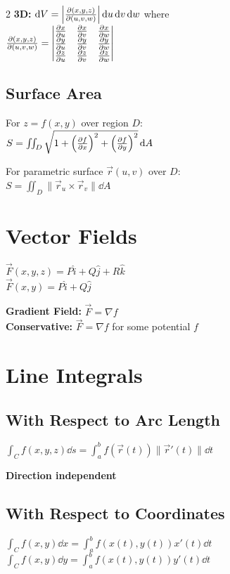 \documentclass[8pt]{extarticle}
\begin{document}
\begin{multicols}{2}
\textbf{3D:} $\dd{V} = \left|\pdv{(x,y,z)}{(u,v,w)}\right| \dd{u}\dd{v}\dd{w}$ where \\
$\pdv{(x,y,z)}{(u,v,w)} = \begin{vmatrix} \pdv{x}{u} & \pdv{x}{v} & \pdv{x}{w} \\ \pdv{y}{u} & \pdv{y}{v} & \pdv{y}{w} \\ \pdv{z}{u} & \pdv{z}{v} & \pdv{z}{w} \end{vmatrix}$

\subsection*{Surface Area}
For $z = f(x,y)$ over region $D$: \\
$S = \iint_D \sqrt{1 + \left(\pdv{f}{x}\right)^2 + \left(\pdv{f}{y}\right)^2} \dd{A}$

For parametric surface $\vec{r}(u,v)$ over $D$: \\
$S = \iint_D \|\vec{r}_u \times \vec{r}_v\| \dd{A}$

\columnbreak

\section*{Vector Fields}

$\vec{F}(x,y,z) = P\hat{i} + Q\hat{j} + R\hat{k}$ \\
$\vec{F}(x,y) = P\hat{i} + Q\hat{j}$

\textbf{Gradient Field:} $\vec{F} = \nabla f$ \\
\textbf{Conservative:} $\vec{F} = \nabla f$ for some potential $f$

\section*{Line Integrals}

\subsection*{With Respect to Arc Length}
$\int_C f(x,y,z) \dd{s} = \int_a^b f(\vec{r}(t)) \|\vec{r}'(t)\| \dd{t}$

\textbf{Direction independent}

\subsection*{With Respect to Coordinates}
$\int_C f(x,y) \dd{x} = \int_a^b f(x(t),y(t)) x'(t) \dd{t}$ \\
$\int_C f(x,y) \dd{y} = \int_a^b f(x(t),y(t)) y'(t) \dd{t}$


\end{multicols}
\end{document}
